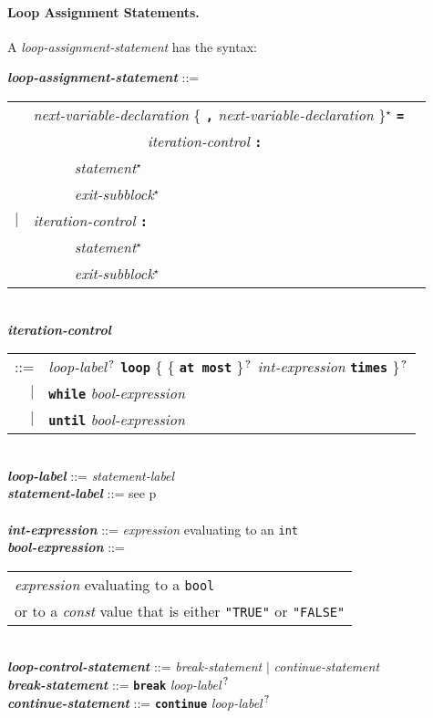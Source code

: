 \documentclass[12pt]{article}
\newcommand{\subsubsubsection}[1]{\paragraph[#1]{#1.}}
\newcommand{\TT}[1]{{\tt \bfseries #1}}
\newcommand{\STAR}{{\Large $^\star$}}
\newcommand{\QMARK}{{$^{\,\mbox{\footnotesize ?}}$}}
\newcommand{\ttkey}[1]{{\tt \bfseries #1}}
\newcommand{\emkey}[1]{{\em \bfseries #1}}
\newcommand{\pagref}[1]{p\pageref{#1}}
\newenvironment{indpar}[1][0.3in]%
	{\begin{list}{}%
		     {\setlength{\itemsep}{0in}%
		      \setlength{\topsep}{0in}%
		      \setlength{\parsep}{1ex}%
		      \setlength{\labelwidth}{#1}%
		      \setlength{\leftmargin}{#1}%
		      \addtolength{\leftmargin}{\labelsep}}%
	 \item}%
	{\end{list}}
\begin{document}
\subsubsubsection{Loop Assignment Statements}
\label{LOOP-ASSIGNMENT-STATEMENTS}

A {\em loop-assignment-statement} has the syntax:

\begin{indpar}
\emkey{loop-assignment-statement} ::= \\
\hspace*{0.5in}
    \begin{tabular}[t]{@{}rll}
        & {\em next-variable-declaration}
                \{ \TT{,} {\em next-variable-declaration} \}\STAR{}
		\TT{=} \\
	& ~~~~~~~~~~~~~~~ {\em iteration-control} \TT{:} \\
        & ~~~~~ {\em statement}\STAR{} \\
        & ~~~~~ {\em exit-subblock}\STAR{} \\
    $|$ & {\em iteration-control} \TT{:} \\
        & ~~~~~ {\em statement}\STAR{} \\
        & ~~~~~ {\em exit-subblock}\STAR{} \\
    \end{tabular}
\\[0.5ex]
\emkey{iteration-control}\label{ITERATION-CONTROL}
    \begin{tabular}[t]{rl}
     ::= & {\em loop-label}\QMARK{} \ttkey{loop}
	   \{ \{ \ttkey{at most} \}\QMARK{}
	   {\em int-expression} \ttkey{times} \}\QMARK{} \\
     $|$ & \ttkey{while} {\em bool-expression} \\
     $|$ & \ttkey{until} {\em bool-expression} \\
     \end{tabular}
\\[0.5ex]
\emkey{loop-label} ::= {\em statement-label}
\\[0.5ex]
\emkey{statement-label} ::= see \pagref{STATEMENT-LABEL} \\
\\[0.5ex]
\emkey{int-expression} ::= {\em expression} evaluating to an {\tt int}
\\[0.5ex]
\emkey{bool-expression}\label{BOOL-EXPRESSION} ::=
    \begin{tabular}[t]{@{}l}
    {\em expression} evaluating to a {\tt bool} \\
    or to a {\em const} value that is either {\tt "TRUE"} or {\tt "FALSE"}
    \end{tabular}
\\[0.5ex]
\emkey{loop-control-statement}\label{LOOP-CONTROL-STATEMENT} ::=
    {\em break-statement} $|$ {\em continue-statement}
\\[0.5ex]
\emkey{break-statement}\label{BREAK-STATEMENT} ::=
    \ttkey{break} {\em loop-label}\QMARK{}
\\[0.5ex]
\emkey{continue-statement}\label{CONTINUE-STATEMENT} ::=
    \ttkey{continue} {\em loop-label}\QMARK{}
\end{indpar}
\end{document}
